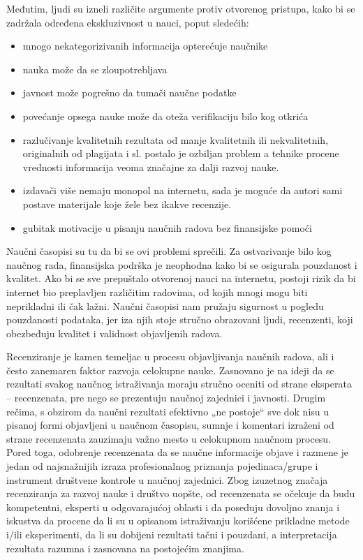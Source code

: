 \documentclass[12pt,a4paper]{article}
\begin{document}
     Međutim, ljudi su izneli različite argumente protiv otvorenog pristupa, kako bi se zadržala određena ekskluzivnost u nauci, poput sledećih:

     \begin{itemize}
         \item mnogo nekategorizivanih informacija opterećuje naučnike
         \item nauka može da se zloupotrebljava
         \item javnost može pogrešno da tumači naučne podatke
         \item povećanje opsega nauke može da oteža verifikaciju bilo kog otkrića
         \item razlučivanje kvalitetnih rezultata od manje kvalitetnih ili nekvalitetnih, originalnih od plagijata i sl. postalo je ozbiljan problem a tehnike procene vrednosti informacija veoma značajne za dalji razvoj nauke.
         \item izdavači više nemaju monopol na internetu, sada je moguće da autori sami postave materijale koje žele bez ikakve recenzije.
         \item gubitak motivacije u pisanju naučnih radova bez finansijske pomoći \cite{2}
         
     \end{itemize}

    \qquad
     Naučni časopisi su tu da bi se ovi problemi sprečili. Za ostvarivanje bilo kog naučnog rada, finansijska podrška je neophodna kako bi se osigurala pouzdanost i kvalitet. Ako bi se sve prepuštalo otvorenoj nauci na internetu, postoji rizik da bi internet bio preplavljen različitim radovima, od kojih mnogi mogu biti neprikladni ili čak lažni. Naučni časopisi nam pružaju sigurnost u pogledu pouzdanosti podataka, jer iza njih stoje stručno obrazovani ljudi, recenzenti, koji obezbeđuju kvalitet i validnost objavljenih radova.
     
   Recenziranje je kamen temeljac u procesu objavljivanja naučnih radova, ali i često zanemaren faktor razvoja celokupne nauke. Zasnovano je na ideji da se rezultati svakog naučnog istraživanja moraju stručno oceniti od strane eksperata – recenzenata, pre nego se prezentuju naučnoj zajednici i javnosti. Drugim rečima, s obzirom da naučni rezultati efektivno „ne postoje“ sve dok nisu u pisanoj formi objavljeni u naučnom časopisu, sumnje i komentari izraženi od strane recenzenata zauzimaju važno mesto u celokupnom naučnom procesu. Pored toga, odobrenje recenzenata da se naučne informacije objave i razmene je jedan od najsnažnijih izraza profesionalnog priznanja pojedinaca/grupe i instrument društvene kontrole u naučnoj zajednici. Zbog izuzetnog značaja recenziranja za razvoj nauke i društvo uopšte, od recenzenata se očekuje da budu kompetentni, eksperti u odgovarajućoj oblasti i da poseduju dovoljno znanja i iskustva da procene da li su u opisanom istraživanju korišćene prikladne metode i/ili eksperimenti, da li su dobijeni rezultati tačni i pouzdani, a interpretacija rezultata razumna i zasnovana na postojećim znanjima.  \cite{1}
  
\end{document}
